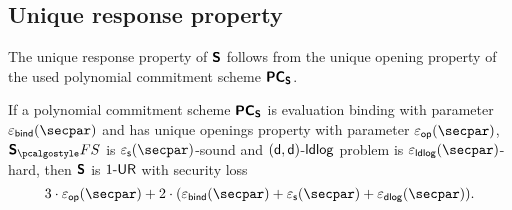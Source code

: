 \subsection{Unique response property}
The unique response property of $\bm{\mathsf{S}}$ follows from the unique opening
property of the used polynomial commitment scheme $\bm{\mathsf{PC}}_{\bm{\mathsf{S}}}$.
\begin{lemma}
\label{lem:sonicprot_ur}
If a polynomial commitment scheme $\bm{\mathsf{PC}}_{\bm{\mathsf{S}}}$ is evaluation binding with parameter
$\epsbind (\secpar)$ and has unique openings property with parameter $\epsop(\secpar)$,
$\sonicprotfs$ is $\epss (\secpar)$-sound and $(\mathsf{d}, \mathsf{d})$-$\mathsf{ldlog}$ problem is
$\epsldlog (\secpar)$-hard, then $\bm{\mathsf{S}}$ is ${1\text{-}\mathsf{UR}}$  with security loss
  \[
    3 \cdot \epsop (\secpar) + 2 \cdot (\epsbind (\secpar) + \epss (\secpar) +
    \epsdlog (\secpar)).
  \]
\end{lemma}

